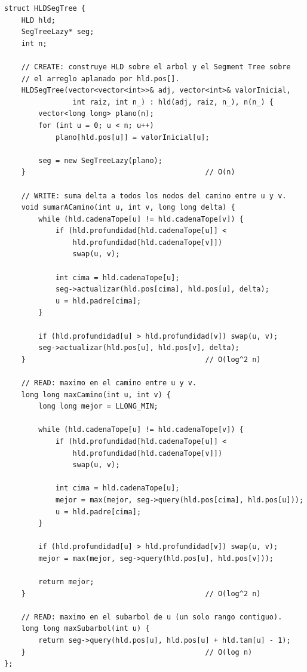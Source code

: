\documentclass[10pt,a4paper,twocolumn]{article}
\begin{document}
\begin{lstlisting}[style=cpp]
struct HLDSegTree {
    HLD hld;
    SegTreeLazy* seg;
    int n;

    // CREATE: construye HLD sobre el arbol y el Segment Tree sobre
    // el arreglo aplanado por hld.pos[].
    HLDSegTree(vector<vector<int>>& adj, vector<int>& valorInicial,
                int raiz, int n_) : hld(adj, raiz, n_), n(n_) {
        vector<long long> plano(n);
        for (int u = 0; u < n; u++)
            plano[hld.pos[u]] = valorInicial[u];

        seg = new SegTreeLazy(plano);
    }                                          // O(n)

    // WRITE: suma delta a todos los nodos del camino entre u y v.
    void sumarACamino(int u, int v, long long delta) {
        while (hld.cadenaTope[u] != hld.cadenaTope[v]) {
            if (hld.profundidad[hld.cadenaTope[u]] <
                hld.profundidad[hld.cadenaTope[v]])
                swap(u, v);

            int cima = hld.cadenaTope[u];
            seg->actualizar(hld.pos[cima], hld.pos[u], delta);
            u = hld.padre[cima];
        }

        if (hld.profundidad[u] > hld.profundidad[v]) swap(u, v);
        seg->actualizar(hld.pos[u], hld.pos[v], delta);
    }                                          // O(log^2 n)

    // READ: maximo en el camino entre u y v.
    long long maxCamino(int u, int v) {
        long long mejor = LLONG_MIN;

        while (hld.cadenaTope[u] != hld.cadenaTope[v]) {
            if (hld.profundidad[hld.cadenaTope[u]] <
                hld.profundidad[hld.cadenaTope[v]])
                swap(u, v);

            int cima = hld.cadenaTope[u];
            mejor = max(mejor, seg->query(hld.pos[cima], hld.pos[u]));
            u = hld.padre[cima];
        }

        if (hld.profundidad[u] > hld.profundidad[v]) swap(u, v);
        mejor = max(mejor, seg->query(hld.pos[u], hld.pos[v]));

        return mejor;
    }                                          // O(log^2 n)

    // READ: maximo en el subarbol de u (un solo rango contiguo).
    long long maxSubarbol(int u) {
        return seg->query(hld.pos[u], hld.pos[u] + hld.tam[u] - 1);
    }                                          // O(log n)
};
\end{lstlisting}
\end{document}

